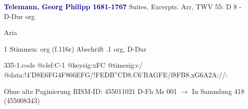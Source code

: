 \documentclass[twocolumn]{book}
\begin{document}
\newline \par \vspace{7pt} \textcolor{darkblue}{\textbf{Telemann, Georg Philipp  1681-1767}}
\newline Suites. Excerpts. Arr, TWV 55: D 8 - D-Dur
\newline org
\newline \begin{itshape}[f.116r, heading:] Aria\end{itshape} 
\newline \textcolor{darkblue}{}  1 Stimmen: org  (f.116r)
\newline Abschrift
.1  org, D-Dur  
\begin{filecontents*}{335-1.code}
@clef:C-1
@keysig:xFC
@timesig:c/
@data:!4'D{8E6FG}4F{866EFG}/!{FED}{B''CD}{8.C6'B}{AGFE}/f{8FB}{8.xG6A}2A://:
\end{filecontents*}
\newline
%
\newline Ohne alte Paginierung
\newline RISM-ID: 455011021
\newline D-Fh  Ms 001
\newline $\rightarrow$ In Sammlung 418 (455008343)
      
\end{document}
